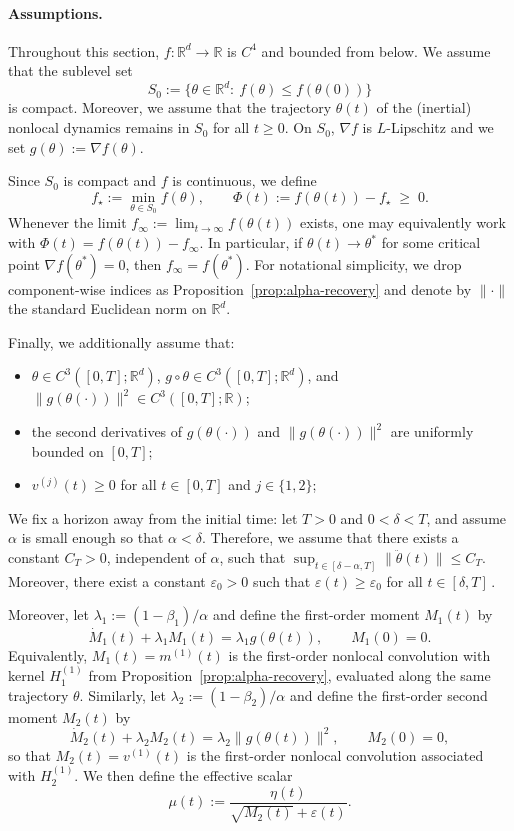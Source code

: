 \documentclass{article} %
\begin{document}
\paragraph{Assumptions.} Throughout this section, $f:\mathbb{R}^d\to\mathbb{R}$ is $C^4$ and bounded from below. We assume that the sublevel set
\[
S_0:=\{\theta\in\mathbb{R}^d:\ f(\theta)\le f(\theta(0))\}
\]
is compact. Moreover, we assume that the trajectory $\theta(t)$ of the (inertial) nonlocal dynamics remains in $S_0$ for all $t\ge 0$. On $S_0$, $\nabla f$ is $L$-Lipschitz and we set $g(\theta):=\nabla f(\theta)$.

Since $S_0$ is compact and $f$ is continuous, we define
\[
f_\star:=\min_{\theta\in S_0} f(\theta),
\qquad
\Phi(t):=f(\theta(t))-f_\star \;\ge\; 0.
\]
Whenever the limit $f_\infty:=\lim_{t\to\infty} f(\theta(t))$ exists, one may equivalently work with $\Phi(t)=f(\theta(t))-f_\infty$. In particular, if $\theta(t)\to\theta^*$ for some critical point $\nabla f(\theta^*)=0$, then $f_\infty=f(\theta^*)$. For notational simplicity, we drop component-wise indices as Proposition~\ref{prop:alpha-recovery} and denote by $\|\cdot\|$ the standard Euclidean norm on $\mathbb{R}^d$.

Finally, we additionally assume that:
\begin{itemize}
  \item $\theta\in C^3([0,T];\mathbb{R}^d)$, $g\circ\theta\in C^3([0,T];\mathbb{R}^d)$, and $\|g(\theta(\cdot))\|^2\in C^3([0,T];\mathbb{R})$;
  \item the second derivatives of $g(\theta(\cdot))$ and $\|g(\theta(\cdot))\|^2$ are uniformly bounded on $[0,T]$;
  \item $v^{(j)}(t)\ge 0$ for all $t\in[0,T]$ and $j\in\{1,2\}$;
\end{itemize}

We fix a horizon away from the initial time: let $T>0$ and $0<\delta<T$, and assume $\alpha$ is small enough so that $\alpha<\delta$. Therefore, we assume that there exists a constant $C_T>0$, independent of $\alpha$, such that $\sup_{t\in[\delta-\alpha,T]}\|\ddot{\theta}(t)\|\le C_T$. Moreover, there exist a constant $\varepsilon_0>0$ such that $\varepsilon(t)\ge \varepsilon_0$ for all $t\in[\delta,T]\,.$ 

Moreover, let $\lambda_1:=(1-\beta_1)/\alpha$ and define the first-order moment $M_1(t)$ by
\[
\dot M_1(t)+\lambda_1 M_1(t)=\lambda_1 g(\theta(t)),\qquad M_1(0)=0.
\]
Equivalently, $M_1(t)=m^{(1)}(t)$ is the first-order nonlocal convolution with kernel $H^{(1)}_1$ from Proposition~\ref{prop:alpha-recovery}, evaluated along the same trajectory $\theta$. Similarly, let $\lambda_2:=(1-\beta_2)/\alpha$ and define the first-order second moment $M_2(t)$ by
\[
\dot M_2(t)+\lambda_2 M_2(t)=\lambda_2 \|g(\theta(t))\|^2,\qquad M_2(0)=0,
\]
so that $M_2(t)=v^{(1)}(t)$ is the first-order nonlocal convolution associated with $H^{(1)}_2$. We then define the effective scalar
\[
\mu(t):=\frac{\eta(t)}{\sqrt{M_2(t)}+\varepsilon(t)}.
\]
\end{document}
